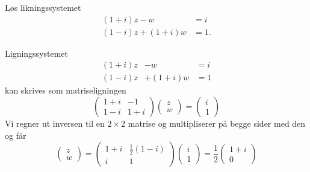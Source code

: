 
\begin{oppgave}
Løs likningssystemet
\begin{align*}
(1+i) z - w   &= i \\
(1-i) z + (1+i) w &= 1.
\end{align*}
\end{oppgave}

\begin{losning}
Ligningssystemet 
\begin{equation*}
\begin{matrix}
(1+i)z &- w &= i \\
(1-i)z &+ (1+i)w &= 1
\end{matrix}
\end{equation*}
kan skrives som matriseligningen
\begin{equation*}
\begin{pmatrix}	
1+i & -1 \\
1-i & 1+i
\end{pmatrix}
\begin{pmatrix}
z \\ w
\end{pmatrix}	
=
\begin{pmatrix}
i \\ 1
\end{pmatrix}
\end{equation*}
Vi regner ut inversen til en $2\times 2$ matrise og multipliserer på begge sider med den og får
\begin{equation*}
\begin{pmatrix}
z \\ w
\end{pmatrix}
=
\begin{pmatrix}
1 + i & \frac{1}{2}(1 - i) \\
i& 1
\end{pmatrix}
\begin{pmatrix}
i \\ 1
\end{pmatrix}
= \frac{1}{2}
\begin{pmatrix}
1 + i \\ 0
\end{pmatrix}	
\end{equation*}
\end{losning}


